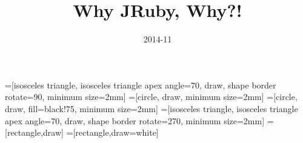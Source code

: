 \usepackage{etex}
\usepackage[english]{babel}

\usepackage[all]{xy}
\usepackage[latin1]{inputenc}

\usepackage{palatino,courier}
\usepackage{amsfonts,amssymb}
\usepackage[mathscr]{euscript}
\usepackage{stmaryrd}
\usepackage{eulervm}

\usepackage{proof}
\usepackage{amsmath}
\usepackage{xspace}

\usepackage{graphicx}
\usepackage{tikz}
\usepackage{listings}
\usepackage{color}

\lstset{language=Ruby}
\usetikzlibrary{calc,arrows,positioning,shapes.geometric,fit,decorations.markings}


\tikzset{ node distance=.1mm, inner sep=0.5mm}

=[isosceles triangle, isosceles triangle apex angle=70, draw, shape border rotate=90, minimum size=2mm]
=[circle, draw, minimum size=2mm]
=[circle, draw, fill=black!75, minimum size=2mm]
=[isosceles triangle, isosceles triangle apex angle=70, draw, shape border rotate=270, minimum size=2mm]
=[rectangle,draw]
=[rectangle,draw=white]




\title{Why JRuby, Why?!}

\author[Brett~Giles]{}



\date
{2014-11}

\subject{JRuby}



